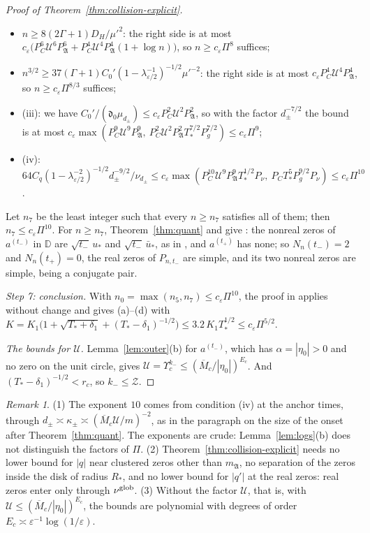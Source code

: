 \documentclass[11pt]{amsart}
\theoremstyle{definition}
\theoremstyle{remark}
\newtheorem{remark}[theorem]{Remark}
\numberwithin{equation}{section}
\newcommand{\D}{\mathbb{D}}
\newcommand{\eps}{\varepsilon}
\begin{document}
\begin{proof}[Proof of Theorem~\ref{thm:collision-explicit}]
\begin{itemize}
\item $n\ge8(2\Gamma+1)D_H/\mu'^2$: the right side is at most $c_\eps\bigl(P_C^6\mathcal U^6P_{\mathfrak A}^6+P_C^4\mathcal U^4P_{\mathfrak A}^4(1+\log n)\bigr)$, so $n\ge c_\eps\Pi^8$ suffices;
\item $n^{3/2}\ge37(\Gamma+1)C_0'(1-\lambda_{\eps/2}^{-1})^{-1/2}\mu'^{-2}$: the right side is at most $c_\eps P_C^4\mathcal U^4P_{\mathfrak A}^4$, so $n\ge c_\eps\Pi^{8/3}$ suffices;
\item (iii): we have $C_0'/(\mathfrak d_0\mu_{d_\pm})\le c_\eps P_C^2\mathcal U^2P_{\mathfrak A}^2$, so with the factor $d_\pm^{-7/2}$ the bound is at most $c_\eps\max(P_C^9\mathcal U^9P_{\mathfrak A}^9,\allowbreak\ P_C^2\mathcal U^2P_{\mathfrak A}^2T_*^{7/2}P_g^{7/2})\le c_\eps\Pi^9$;
\item (iv): $64C_q(1-\lambda_{\eps/2}^{-2})^{-1/2}d_\pm^{-9/2}/\nu_{d_\pm}\le c_\eps\max(P_C^{10}\mathcal U^9P_{\mathfrak A}^9T_*^{1/2}P_\nu,\allowbreak\ P_CT_*^5P_g^{9/2}P_\nu)\le c_\eps\Pi^{10}$.
\end{itemize}
Let $n_7$ be the least integer such that every $n\ge n_7$ satisfies all of them; then $n_7\le c_\eps\Pi^{10}$. For $n\ge n_7$, Theorem~\ref{thm:quant} and \cite[\eqref{M-eq:collision-S1}]{Main} give \cite[\eqref{M-eq:collision-anchor}]{Main}: the nonreal zeros of $a^{(t_-)}$ in $\D$ are $\sqrt{t_-}\,u_*$ and $\sqrt{t_-}\,\bar u_*$, as in \cite[Section~\ref{M-subsec:collision-proof}]{Main}, and $a^{(t_+)}$ has none; so $N_n(t_-)=2$ and $N_n(t_+)=0$, the real zeros of $P_{n,t_-}$ are simple, and its two nonreal zeros are simple, being a conjugate pair.

\emph{Step 7: conclusion.} With $n_0=\max(n_5,n_7)\le c_\eps\Pi^{10}$, the proof in \cite[Section~\ref{M-subsec:collision-proof}]{Main} applies without change and gives (a)--(d) with $K=K_1\bigl(1+\sqrt{T_*+\delta_1}+(T_*-\delta_1)^{-1/2}\bigr)\le3.2\,K_1T_*^{1/2}\le c_\eps\Pi^{5/2}$.

\emph{The bounds for $\mathcal U$.} Lemma~\ref{lem:outer}(b) for $a^{(t_-)}$, which has $\alpha=|\eta_0|>0$ and no zero on the unit circle, gives $\mathcal U=\Upsilon_c^{k_-}\le(\overline M_c/|\eta_0|)^{E_c}$. And $(T_*-\delta_1)^{-1/2}<r_c$, so $k_-\le\mathcal Z$.
\end{proof}

\begin{remark}\label{rem:collision-explicit}
(1) The exponent $10$ comes from condition (iv) at the anchor times, through $d_\pm\asymp\kappa_\pm\asymp(\overline M_c\mathcal U/m)^{-2}$, as in the paragraph on the size of the onset after Theorem~\ref{thm:quant}. The exponents are crude: Lemma~\ref{lem:logs}(b) does not distinguish the factors of $\Pi$. (2) Theorem~\ref{thm:collision-explicit} needs no lower bound for $|q|$ near clustered zeros other than $m_{\mathfrak A}$, no separation of the zeros inside the disk of radius $R_*$, and no lower bound for $|q'|$ at the real zeros: real zeros enter only through $\nu^{\rm glob}$. (3) Without the factor $\mathcal U$, that is, with $\mathcal U\le(\overline M_c/|\eta_0|)^{E_c}$, the bounds are polynomial with degrees of order $E_c\asymp\eps^{-1}\log(1/\eps)$.
\end{remark}
\end{document}
